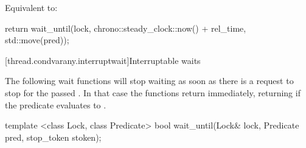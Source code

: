 \begin{itemdescr}
\pnum
\effects Equivalent to:
\begin{codeblock}
return wait_until(lock, chrono::steady_clock::now() + rel_time, std::move(pred));
\end{codeblock}
\end{itemdescr}



\clearpage

{\color{insertcolor}


[thread.condvarany.interruptwait]{Interruptable waits}

\pnum
The following wait functions will stop waiting
as soon as there is a request to stop for the passed .
In that case the functions return immediately,
returning  if the predicate evaluates to . 




\begin{itemdecl}
template <class Lock, class Predicate>
  bool wait_until(Lock& lock,
                  Predicate pred,
                  stop_token stoken);
\end{itemdecl}

}
